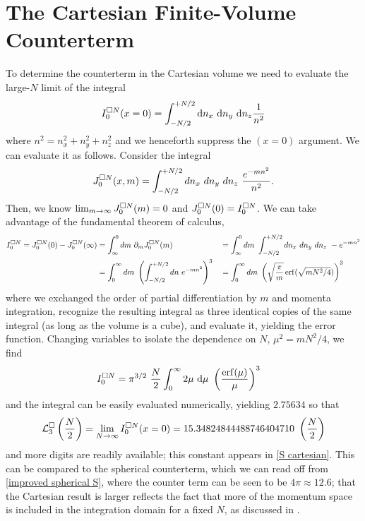 \section{The Cartesian \Luscher Finite-Volume Counterterm}\label{sec:counterterm/cartesian}

To determine the counterterm in the Cartesian volume we need to evaluate the large-$N$ limit of the integral
\begin{equation}
	I^{\square N}_0(x=0) = \int_{-N/2}^{+N/2} \mathrm{d}n_x\ \mathrm{d}n_y\ \mathrm{d}n_z \frac{1}{n^2}
\end{equation}
where $n^2 = n_x^2+n_y^2+n_z^2$ and we henceforth suppress the $(x=0)$ argument.
We can evaluate it as follows.  Consider the integral
\begin{equation}
	J^{\square N}_0(x, m) = \int_{-N/2}^{+N/2} dn_x\ dn_y\ dn_z\ \frac{e^{-m n^2}}{n^2}.
\end{equation}
Then, we know $\lim_{m\rightarrow\infty} J^{\square N}_0(m) = 0$ and $J^{\square N}_0(0) = I^{\square N}_0$.
We can take advantage of the fundamental theorem of calculus,
\begin{align}
	I^{\square N}_0 = J^{\square N}_0(0) - J^{\square N}_0(\infty)
		&= 	\int_{\infty}^{0} dm\ \partial_m J^{\square N}_0(m)
		&&=	\int_{\infty}^{0} dm\ \int_{-N/2}^{+N/2} dn_x\ dn_y\ dn_z\ -e^{-m n^2}
		\nonumber\\
		&=	\int_0^\infty dm\ \left(\int_{-N/2}^{+N/2} dn\ e^{-m n^2}\right)^3
		&&=	\int_0^\infty dm\ \left(\sqrt{\frac{\pi}{m}} \operatorname{erf}(\sqrt{m N^2/4})\right)^3
\end{align}
where we exchanged the order of partial differentiation by $m$ and momenta integration, recognize the resulting integral as three identical copies of the same integral (as long as the volume is a cube), and evaluate it, yielding the error function.
Changing variables to isolate the dependence on $N$, $\mu^2 = m N^2/4$, we find
\begin{align}
    I^{\square N}_0
    &=
    \pi^{3/2}\ \frac{N}{2} \int_{0}^\infty 2\mu\ \mathrm{d}\mu\ \left(\frac{\operatorname{erf}(\mu)}{\mu}\right)^3
\end{align}
and the integral can be easily evaluated numerically, yielding $2.75634$ so that
\begin{equation}
    \mathcal{L}^\square_3 \left(\frac{N}{2}\right) = \lim_{N\rightarrow\infty}I^{\square N}_0(x=0) = 15.34824844488746404710\ \left(\frac{N}{2}\right)
\end{equation}
and more digits are readily available; this constant appears in \eqref{S cartesian}.
This can be compared to the spherical counterterm, which we can read off from \eqref{improved spherical S}, where the counter term can be seen to be $4\pi \approx 12.6 $; that the Cartesian result is larger reflects the fact that more of the momentum space is included in the integration domain for a fixed $N$, as discussed in .


